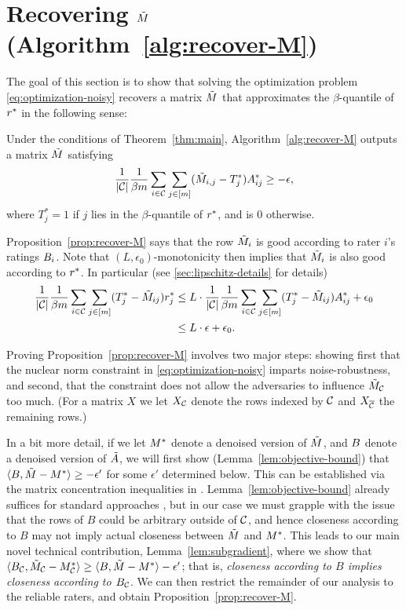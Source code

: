 \section{Recovering $\tilde{M}$ (Algorithm~\ref{alg:recover-M})}
\label{sec:approach-M}

The goal of this section is to show that solving the optimization 
problem \eqref{eq:optimization-noisy} recovers a matrix $\tilde{M}$ that 
approximates the $\beta$-quantile of $r^*$ in the following sense:
\begin{proposition}
\label{prop:recover-M}
Under the conditions of Theorem~\ref{thm:main}, Algorithm~\ref{alg:recover-M} 
outputs a matrix $\tilde{M}$ satisfying 
\[ \frac{1}{|\mathcal{C}|} \frac{1}{\beta m} \sum_{i \in \mathcal{C}} \sum_{j \in [m]} (\tilde{M}_{i,j}-T^*_j)A^*_{ij} \geq -\epsilon, \]
where $T^*_j = 1$ if $j$ lies in the $\beta$-quantile of $r^*$, and is $0$ otherwise.
\end{proposition}
Proposition~\ref{prop:recover-M} says that the row $\tilde{M}_i$ 
is good according to rater $i$'s ratings $B_i$. Note that
$(L,\epsilon_0)$-monotonicity 
then implies that $\tilde{M}_i$ is also good according to $r^*$.
In particular (see \ref{sec:lipschitz-details} for details)
\begin{align}
\label{eq:lipschitz-usage}
\frac{1}{|\mathcal{C}|}\frac{1}{\beta m}\sum_{i \in \mathcal{C}}\sum_{j \in [m]} (T_j^*-\tilde{M}_{ij})r^*_j
&\leq L \cdot \frac{1}{|\mathcal{C}|}\frac{1}{\beta m}\sum_{i \in \mathcal{C}}\sum_{j \in [m]} (T_j^*-\tilde{M}_{ij})A^*_{ij} + \epsilon_0 \\
&\leq L \cdot \epsilon + \epsilon_0.
\end{align}

Proving Proposition~\ref{prop:recover-M} involves two major steps: showing 
first that the nuclear norm constraint in \eqref{eq:optimization-noisy} 
imparts noise-robustness, and second, that the constraint does not allow 
the adversaries to influence $\tilde{M}_{\mathcal{C}}$ too much. (For a matrix $X$ 
we let $X_{\mathcal{C}}$ denote the rows indexed by $\mathcal{C}$ and $X_{\overline{\mathcal{C}}}$ the remaining rows.)

In a bit 
more detail, if we let $M^*$ denote a denoised version of $\tilde{M}$, and $B$ 
denote a denoised version of $\tilde{A}$, we will first show 
(Lemma~\ref{lem:objective-bound}) that 
$\langle B, \tilde{M} - M^* \rangle \geq -\epsilon'$ for some $\epsilon'$ 
determined below. This can be established via the matrix concentration 
inequalities in \citet{le2015concentration}. Lemma~\ref{lem:objective-bound} already 
suffices for standard approaches \citep[e.g.][]{guedon2014community}, 
but in our case we must grapple with the issue that the rows of $B$ could be 
arbitrary outside of $\mathcal{C}$, and hence closeness according to $B$ may not 
imply actual closeness between $\tilde{M}$ and $M^*$. This leads to our main 
novel technical contribution, Lemma~\ref{lem:subgradient}, where we show 
that $\langle B_{\mathcal{C}}, \tilde{M}_{\mathcal{C}} - M^*_{\mathcal{C}} \rangle \geq \langle B, \tilde{M} - M^* \rangle - \epsilon'$; 
that is, \emph{closeness according to $B$ implies closeness according to 
$B_{\mathcal{C}}$}. We can then restrict the remainder of our analysis to the 
reliable raters, and obtain Proposition~\ref{prop:recover-M}.

